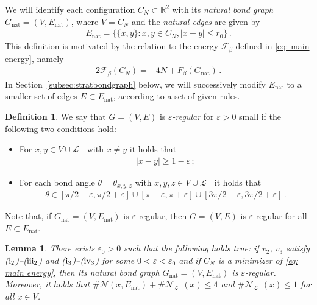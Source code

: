 \documentclass[reqno]{amsart}
\theoremstyle{plain}
\newtheorem{lemma}[theorem]{Lemma}
\theoremstyle{definition}
\newtheorem{definition}[theorem]{Definition}
\numberwithin{equation}{section}
\begin{document}
 We will identify each configuration $C_N \subset \mathbb{R}^2$ with its \emph{natural bond graph} $G_{\mathrm{nat}}=(V,E_{\mathrm{nat}})$, where $V=C_N$ and the \emph{natural edges} are given by
\begin{align}\label{eq: relation-new}
  E_\mathrm{nat}   = \{\{x,y\} \colon x,y \in C_N, |x-y|\leq r_0\}\,.
\end{align}
 This definition is motivated by the  relation to the energy $\mathcal{F}_\beta$ defined in  \eqref{eq: main energy}, namely 
\begin{align}\label{eq: relation}
2\mathcal{F}_\beta(C_N) =  -4N  + F_\beta(G_{\mathrm{nat}})\,.
\end{align} 
  In Section~\ref{subsec:stratbondgraph} below,  we will successively modify $E_{\mathrm{nat}}$ to a smaller set of edges $E\subset E_\mathrm{nat}$, according to a set of given rules. 



\begin{definition}\label{def:epsregular} We say that $G=(V,E)$ is \emph{$\varepsilon$-regular} for $\varepsilon >0$ small if  the following two  conditions hold:
\begin{itemize}
\item[(i)] For $x,y \in V  \cup\mathcal{L}^-$ with $x\neq y$  it holds that
\begin{align*}
 |x-y| \ge 1-\varepsilon\,;
\end{align*}
\item[(ii)] For each bond angle $\theta=\theta_{x,y,z}$ with $x,y,z \in  V  \cup \mathcal{L}^-$ it holds that 
\begin{align*}
\theta \in [\pi/2-\varepsilon,\pi/2+\varepsilon] \cup [\pi-\varepsilon,\pi+\varepsilon] \cup [3\pi/2-\varepsilon,3\pi/2+\varepsilon]\,.
\end{align*}
\end{itemize}
\end{definition}
Note that, if $G_{\mathrm{nat}}=(V,E_{\mathrm{nat}})$ is $\varepsilon$-regular, then  $G=(V,E)$ is $\varepsilon$-regular for all $E\subset E_{\mathrm{nat}}$.

\begin{lemma}\label{lemma:elementaryprop} There exists $\varepsilon_0 >0$ such that the following holds true:  if $v_2$, $v_3$ satisfy {\rm ($\rm{i}_2$)}--{\rm ($\rm{iii}_2$)} and {\rm ($\rm{i}_3$)}--{\rm ($\rm{iv}_3$)} for some $0<\varepsilon<\varepsilon_0$ and  if $C_N$ is a minimizer of \eqref{eq: main energy}, then its natural bond graph $G_{\mathrm{nat}}=(V,E_{\mathrm{nat}})$ is $\varepsilon$-regular. Moreover, it holds that  $\#\mathcal{N}(x,E_{\mathrm{nat}}) + \#\mathcal{N}_{\mathcal{L}^-}(x) \leq 4$ and $ \#\mathcal{N}_{\mathcal{L}^-}(x) \leq 1$  for all $x \in V$.
\end{lemma}
\end{document}
